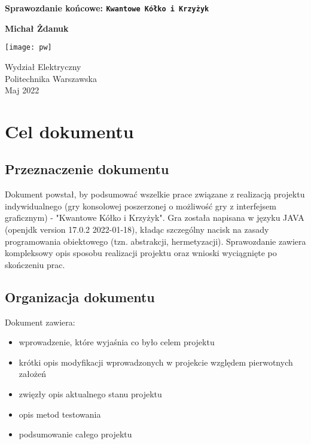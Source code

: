 \documentclass{article}
\begin{document}
\begin{titlepage}
   \begin{center}
        \vspace*{1cm}
        \Large    
        \textbf{Sprawozdanie końcowe: \texttt{Kwantowe Kółko i Krzyżyk}}
            
        \vspace{1.5cm}

       \textbf{Michał Żdanuk}

       \vfill
            
       \vspace{0.8cm}
     
       \texttt{[image: pw]}
            
       Wydział Elektryczny\\
       Politechnika Warszawska\\
       Maj 2022\\
       \vspace{0.8cm}
        \small

   \end{center}
   
\end{titlepage}
\newpage
\setcounter{page}{2}

\section{Cel dokumentu}
\subsection{Przeznaczenie dokumentu}
Dokument powstał, by podsumować wszelkie prace związane z realizacją projektu indywidualnego (gry konsolowej poszerzonej o możliwość gry z interfejsem graficznym) - "Kwantowe Kółko i Krzyżyk". Gra została napisana w języku JAVA (openjdk version 17.0.2   2022-01-18), kładąc szczególny nacisk na zasady programowania obiektowego (tzn. abstrakcji, hermetyzacji). Sprawozdanie zawiera kompleksowy opis sposobu realizacji projektu oraz wnioski wyciągnięte po skończeniu prac.

\subsection{Organizacja dokumentu}
Dokument zawiera:
\begin{itemize}
    \item wprowadzenie, które wyjaśnia co było celem projektu
    \item krótki opis modyfikacji wprowadzonych w projekcie względem pierwotnych założeń
    \item zwięzły opis aktualnego stanu projektu
    \item opis metod testowania
    \item podsumowanie całego projektu
\end{itemize}
\end{document}
